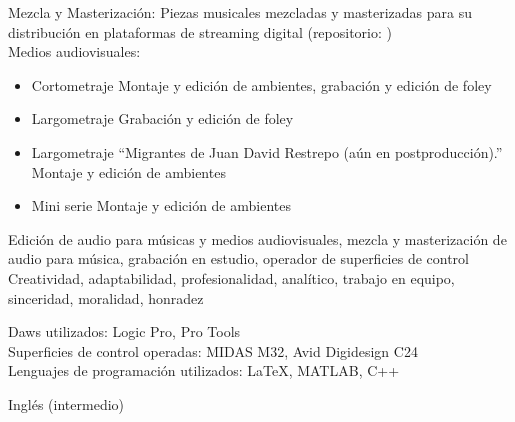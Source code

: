 \vspace*{5pt}
{ %
    Mezcla y Masterización: Piezas musicales mezcladas y masterizadas para su distribución en plataformas de streaming digital (repositorio: ) \\[.5\baselineskip]
    
    Medios audiovisuales:
    \begin{itemize}
        \item Cortometraje  Montaje y edición de ambientes, grabación y edición de foley
        \item Largometraje  Grabación y edición de foley
        \item Largometraje \enquote{Migrantes de Juan David Restrepo (aún en postproducción).} Montaje y edición de ambientes
        \item Mini serie  Montaje y edición de ambientes
    \end{itemize}
}

{ %
    Edición de audio para músicas y medios audiovisuales, mezcla y masterización de audio para música, grabación en estudio, operador de superficies de control \\[.5\baselineskip]

    Creatividad, adaptabilidad, profesionalidad, analítico, trabajo en equipo, sinceridad, moralidad, honradez
}

{ %
    Daws utilizados: Logic Pro, Pro Tools\\
    Superficies de control operadas: MIDAS M32, Avid Digidesign C24 \\
    Lenguajes de programación utilizados: {\LaTeX}, MATLAB, C++
}

{ %
    Inglés (intermedio)
}